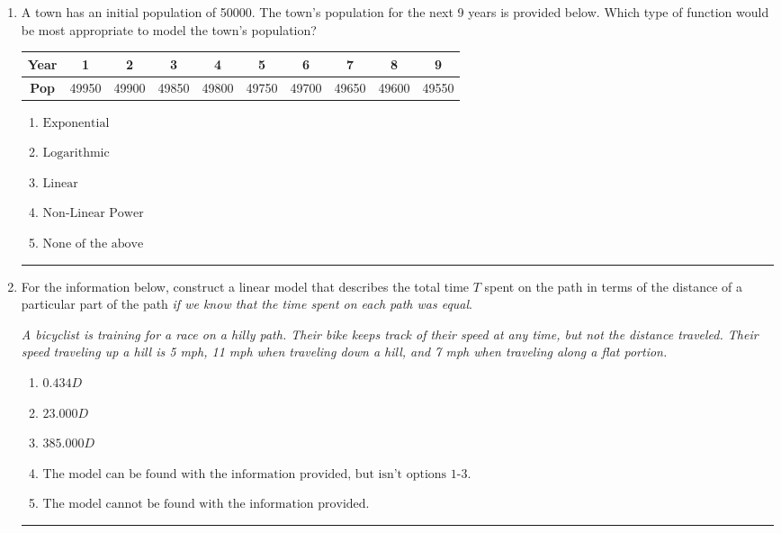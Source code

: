 \documentclass[14pt]{extbook}
\newcommand{\litem}[1]{\item#1\hspace*{-1cm}\rule{\textwidth}{0.4pt}}
\begin{document}
\begin{enumerate}
{\begin{enumerate}[label=\Alph*.]
\end{enumerate} }
\litem{
A town has an initial population of 50000. The town's population for the next 9 years is provided below. Which type of function would be most appropriate to model the town's population?

\begin{tabular}{c|c|c|c|c|c|c|c|c|c}
\textbf{Year} &1 &2 &3 &4 &5 &6 &7 &8 &9\tabularnewline \hline
\textbf{Pop} &49950 &49900 &49850 &49800 &49750 &49700 &49650 &49600 &49550\end{tabular}\begin{enumerate}[label=\Alph*.]
\item \( \text{Exponential} \)
\item \( \text{Logarithmic} \)
\item \( \text{Linear} \)
\item \( \text{Non-Linear Power} \)
\item \( \text{None of the above} \)

\end{enumerate} }
\litem{
For the information below, construct a linear model that describes the total time $T$ spent on the path in terms of the distance of a particular part of the path \textit{if we know that the time spent on each path was equal}.
\begin{center}
    \textit{ A bicyclist is training for a race on a hilly path. Their bike keeps track of their speed at any time, but not the distance traveled. Their speed traveling up a hill is 5 mph, 11 mph when traveling down a hill, and 7 mph when traveling along a flat portion. }
\end{center}
\begin{enumerate}[label=\Alph*.]
\item \( 0.434 D \)
\item \( 23.000 D \)
\item \( 385.000 D \)
\item \( \text{The model can be found with the information provided, but isn't options 1-3.} \)
\item \( \text{The model cannot be found with the information provided.} \)


\end{enumerate}}
\end{enumerate}
\end{document}
